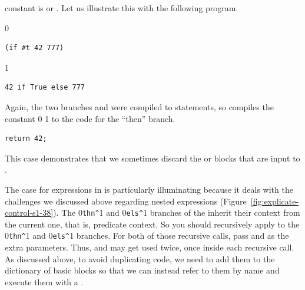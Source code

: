 \documentclass[7x10,nocrop]{TimesAPriori_MIT}%
\def\racketEd{0}
\def\pythonEd{1}
\def\edition{0}
\newcommand{\racket}[1]{{\if\edition\racketEd{#1}\fi}}
\newcommand{\python}[1]{{\if\edition\pythonEd #1\fi}}
\begin{document}
constant is \TRUE{} or \FALSE{}. Let us illustrate this with the
following program.
{\if\edition\racketEd
\begin{center}
\begin{minipage}{\textwidth}
\begin{lstlisting}
(if #t 42 777)
\end{lstlisting}
\end{minipage}
\end{center}
\fi}
{\if\edition\pythonEd
\begin{center}
\begin{minipage}{\textwidth}
\begin{lstlisting}
42 if True else 777
\end{lstlisting}
\end{minipage}
\end{center}
\fi}
%
Again, the two branches  and  were compiled to
 statements, so  compiles the
constant
\racket{}
\python{}
to the code for the ``then'' branch.
\begin{center}
\begin{minipage}{\textwidth}
\begin{lstlisting}
return 42;
\end{lstlisting}
\end{minipage}
\end{center}
%
This case demonstrates that we sometimes discard the  or
 blocks that are input to .

The case for  expressions in  is
particularly illuminating because it deals with the challenges we
discussed above regarding nested  expressions
(Figure~\ref{fig:explicate-control-s1-38}).  The
\racket{\lstinline{thn^}}\python{} and
\racket{\lstinline{els^}}\python{} branches of the
 inherit their context from the current one, that is,
predicate context. So you should recursively apply
 to the
\racket{\lstinline{thn^}}\python{} and
\racket{\lstinline{els^}}\python{} branches. For both of
those recursive calls, pass  and  as the extra
parameters. Thus,  and  may get used twice, once
inside each recursive call. As discussed above, to avoid duplicating
code, we need to add them to the dictionary of basic blocks so that we
can instead refer to them by name and execute them with a .
\end{document}
